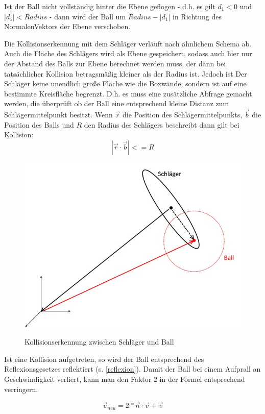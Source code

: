 Ist der Ball nicht vollständig hinter die Ebene geflogen - d.h. es gilt $d_1<0$ und $|d_1|<Radius $ - dann wird der Ball um $Radius - |d_1|$ in Richtung des NormalenVektors der Ebene verschoben.

Die Kollisionserkennung mit dem Schläger verläuft nach ähnlichem Schema ab. Auch die Fläche des Schlägers wird als Ebene gespeichert, sodass auch hier nur der Abstand des Balls zur Ebene berechnet werden muss, der dann bei tatsächlicher Kollision betragsmäßig kleiner als der Radius ist. Jedoch ist Der Schläger keine unendlich große Fläche wie die  Boxwände, sondern ist auf eine bestimmte Kreisfläche begrenzt. D.h. es muss eine zusätzliche Abfrage gemacht werden, die überprüft ob der Ball eine entsprechend kleine Distanz zum Schlägermittelpunkt besitzt.
Wenn $\vec{r}$ die Position des Schlägermittelpunkts, $\vec{b}$ die Position des Balls und $R$ den Radius des Schlägers beschreibt dann gilt bei Kollision:
\begin{equation}
	|\vec{r}\cdot\vec{b}| <= R
\end{equation}

\begin{figure}[h]
   \begin{center}
    \includegraphics[scale=0.4]{bilder/collisionRacket}\label{fig_colRacket}
   \end{center} 
    \caption[Testbilder]{Kollisionserkennung zwischen Schläger und Ball}
        \label{fig_colRacket2}
\end{figure} 

Ist eine Kollision aufgetreten, so wird der Ball entsprechend des Reflexionsgesetzes reflektiert (s. \ref{reflexion}). Damit der Ball bei einem Aufprall an Geschwindigkeit verliert, kann man den Faktor 2 in der Formel entsprechend verringern.

\begin{equation}	
\label{interpolEquation2}
	\vec{v}_{neu} = 2* \vec{n}\cdot\vec{v} + \vec{v}
	\label{reflexion}
\end{equation}